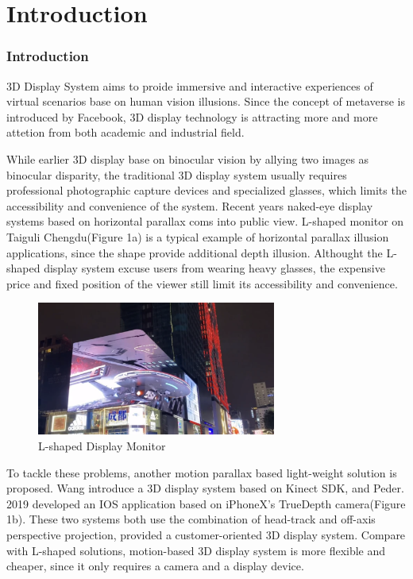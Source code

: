 \part{Introduction}

\section {Introduction}


3D Display System aims to proide immersive and interactive experiences of virtual scenarios base on human vision illusions. Since the concept of metaverse is introduced by Facebook, 3D display technology is attracting more and more attetion from both academic and industrial field.

While earlier 3D display base on binocular vision by allying two images as binocular disparity, the traditional 3D display system usually requires professional photographic capture devices and specialized glasses, which limits the accessibility and convenience of the system. Recent years naked-eye display systems based on horizontal parallax coms into public view. L-shaped monitor on Taiguli Chengdu(Figure 1a) is a typical example of horizontal parallax illusion applications, since the shape provide additional depth illusion.\cite{Wang2024} Althought the L-shaped display system excuse users from wearing heavy glasses, the expensive price and fixed position of the viewer still limit its accessibility and convenience.

\begin{figure}[htb]
    \centering
    \includegraphics[width=0.7\textwidth]{figures/L-shaped.png}
    \caption{L-shaped Display Monitor}\label{F:test-a}
\end{figure}

To tackle these problems, another motion parallax based light-weight solution is proposed\cite{ALLISON20031879}. Wang\cite{Wang_2018} introduce a 3D display system based on Kinect SDK, and Peder. 2019 \cite{TheParallaxView} developed an IOS application based on iPhoneX's TrueDepth camera(Figure 1b). These two systems both use the combination of head-track and off-axis perspective projection, provided a customer-oriented 3D display system. Compare with L-shaped solutions, motion-based 3D display system is more flexible and cheaper, since it only requires a camera and a display device.

